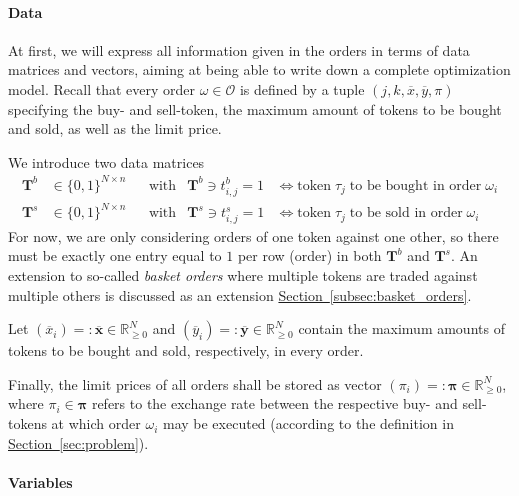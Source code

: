 \documentclass[11pt,parskip=full]{scrartcl}%
\newcommand*{\orders}{\mathcal{O}}          %
\newcommand*{\secref}[1]{\hyperref[{#1}]{Section~\ref*{#1}}}
\newcommand*{\subsecref}[1]{\hyperref[{#1}]{Section~\ref*{#1}}}
\begin{document}
\paragraph{Data}

At first, we will express all information given in the orders in terms of data matrices and
vectors, aiming at being able to write down a complete optimization model.
Recall that every order $ \omega \in \orders $ is defined by a tuple
$ (j,k,\overline{x},\overline{y},\pi) $ specifying the buy- and sell-token, the maximum amount of
tokens to be bought and sold, as well as the limit price.

We introduce two data matrices
\begin{align*}
  \mathbf{T}^b &\in \{0,1\}^{N \times n} && \text{with} & \mathbf{T}^b \ni t^b_{i,j} = 1
  &\Leftrightarrow
  \text{token} \; \tau_j \; \text{to be bought in order} \; \omega_i \\
  \mathbf{T}^s &\in \{0,1\}^{N \times n} && \text{with} & \mathbf{T}^s \ni t^s_{i,j} = 1
  &\Leftrightarrow
  \text{token} \; \tau_j \; \text{to be sold in order} \; \omega_i
\end{align*}
For now, we are only considering orders of one token against one other, so there must be exactly
one entry equal to $ 1 $ per row (order) in both $ \mathbf{T}^b $ and $ \mathbf{T}^s $.
An extension to so-called \emph{basket orders} where multiple tokens are traded against multiple
others is discussed as an extension \secref{subsec:basket_orders}.

Let $ (\overline{x}_i) =: \overline{\mathbf{x}} \in \mathbb{R}^N_{\ge 0} $ and 
$ (\overline{y}_i) =: \overline{\mathbf{y}} \in \mathbb{R}^N_{\ge 0} $ contain the maximum amounts
of tokens to be bought and sold, respectively, in every order.

Finally, the limit prices of all orders shall be stored as vector
$ (\pi_i) =: \bm{\pi} \in \mathbb{R}^N_{\ge 0} $, where $ \pi_i \in \bm{\pi} $ refers to the
exchange rate between the respective buy- and sell-tokens at which order $ \omega_i $ may be
executed (according to the definition in \subsecref{sec:problem}).

\vspace{-.2cm}
\paragraph{Variables}
\end{document}
